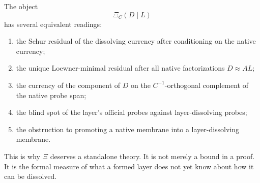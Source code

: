 \documentclass[11pt]{article}
\begin{document}
The object
\[
\boxed{\Xi_C(D\mid L)}
\]
has several equivalent readings:
\begin{enumerate}[label=(\alph*)]
\item the Schur residual of the dissolving currency after conditioning on the native currency;
\item the unique Loewner-minimal residual after all native factorizations $D\approx AL$;
\item the currency of the component of $D$ on the $C^{-1}$-orthogonal complement of the native probe span;
\item the blind spot of the layer's official probes against layer-dissolving probes;
\item the obstruction to promoting a native membrane into a layer-dissolving membrane.
\end{enumerate}

This is why $\Xi$ deserves a standalone theory.  It is not merely a bound in a proof.  It is the formal measure of what a formed layer does not yet know about how it can be dissolved.
\end{document}
